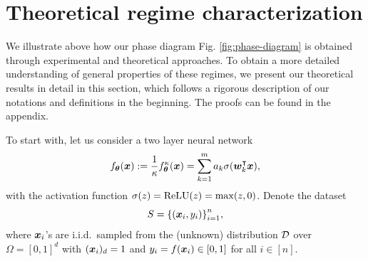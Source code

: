 \documentclass[twoside,11pt]{article}
\begin{document}
\section{Theoretical regime characterization}\label{sec..Theorem}
We illustrate above how our phase diagram Fig. \ref{fig:phase-diagram} is obtained through experimental and theoretical approaches. To obtain a more detailed understanding of general properties of these regimes, we present our theoretical results in detail in this section, which follows a rigorous description of our notations and definitions in the beginning. The proofs can be found in the appendix.

To start with, let us consider a two layer neural network
\begin{equation}
    f_{\bm{\theta}}(\bm{x}) := \frac{1}{\kappa}f^\kappa_{\bm{\theta}}(\bm{x}) = \sum_{k=1}^{m} a_k\sigma(\bm{w}_k^\intercal\bm{x}),
\end{equation}
with the activation function $\sigma(z) = \mathrm{ReLU}(z) = \max(z, 0)$. Denote the dataset
\begin{equation}
    S = {\{(\bm{x}_i, y_i)\}}_{i=1}^n,
\end{equation}
where $\bm{x}_i$'s are i.i.d.\ sampled from the (unknown) distribution $\mathcal{D}$ over $\Omega={[0,1]}^d$ with $(\bm{x}_i)_d=1$ and $y_i=f(\bm{x}_i)\in[0,1]$ for all $i\in[n]$.
\end{document}
